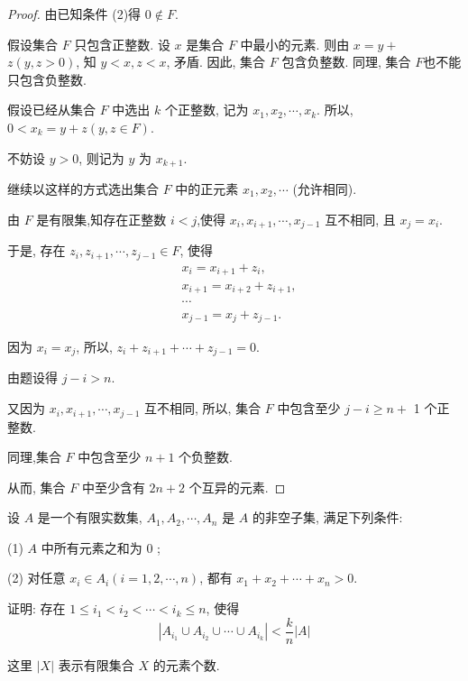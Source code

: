 \begin{proof}
	由已知条件 (2)得 $0 \notin F$.

	假设集合 $F$ 只包含正整数. 设 $x$ 是集合 $F$ 中最小的元素. 则由 $x=y+$ $z(y, z>0)$, 知 $y<x, z<x$, 矛盾. 因此, 集合 $F$ 包含负整数. 同理, 集合 $F$也不能只包含负整数.

	假设已经从集合 $F$ 中选出 $k$ 个正整数, 记为 $x_{1}, x_{2}, \cdots, x_{k}$. 所以, $0<x_{k}=y+z(y, z \in F)$.

	不妨设 $y>0$, 则记为 $y$ 为 $x_{k+1}$.

	继续以这样的方式选出集合 $F$ 中的正元素 $x_{1}, x_{2}, \cdots$ (允许相同).

	由 $F$ 是有限集,知存在正整数 $i<j$,使得 $x_{i}, x_{i+1}, \cdots, x_{j-1}$ 互不相同, 且 $x_{j}=x_{i}$.

	于是, 存在 $z_{i}, z_{i+1}, \cdots, z_{j-1} \in F$, 使得
	$$
		\begin{aligned}
			 & x_{i}=x_{i+1}+z_{i},     \\
			 & x_{i+1}=x_{i+2}+z_{i+1}, \\
			 & \cdots                   \\
			 & x_{j-1}=x_{j}+z_{j-1} .
		\end{aligned}
	$$

	因为 $x_{i}=x_{j}$, 所以, $z_{i}+z_{i+1}+\cdots+z_{j-1}=0$.

	由题设得 $j-i>n$.

	又因为 $x_{i}, x_{i+1}, \cdots, x_{j-1}$ 互不相同, 所以, 集合 $F$ 中包含至少 $j-i \geqslant n+$ 1 个正整数.

	同理,集合 $F$ 中包含至少 $n+1$ 个负整数.

	从而, 集合 $F$ 中至少含有 $2 n+2$ 个互异的元素.
\end{proof}

\begin{example}
	设 $A$ 是一个有限实数集, $A_{1}, A_{2}, \cdots, A_{n}$ 是 $A$ 的非空子集, 满足下列条件:

	(1) $A$ 中所有元素之和为 0 ;

	(2) 对任意 $x_{i} \in A_{i}(i=1,2, \cdots, n)$, 都有 $x_{1}+x_{2}+\cdots+x_{n}>0$.

	证明: 存在 $1 \leqslant i_{1}<i_{2}<\cdots<i_{k} \leqslant n$, 使得
	$$
		\left|A_{i_{1}} \cup A_{i_{2}} \cup \cdots \cup A_{i_{k}}\right|<\frac{k}{n}|A|
	$$

	这里 $|X|$ 表示有限集合 $X$ 的元素个数.
\end{example}

